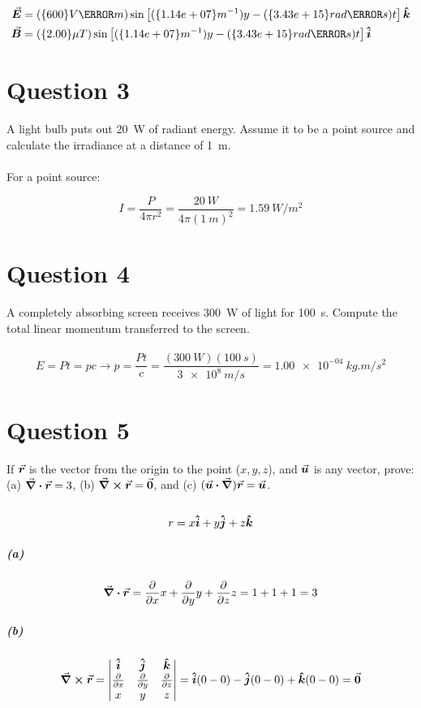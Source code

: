 \documentclass[a4paper]{article}
\begin{document}
\begin{align*}
    \va*{E} &= (\qty{600}{V \per m}) \sin\left[(\qty{1.14e+07}{m^{-1}})y - (\qty{3.43e+15}{rad \per s}) t\right] \vu*{k}  \\
    \va*{B} &= (\qty{2.00}{\mu T}) \sin\left[(\qty{1.14e+07}{m^{-1}})y - (\qty{3.43e+15}{rad \per s}) t\right] \vu*{i}
\end{align*}

\section*{Question 3}
A light bulb puts out \qty{20}{W} of radiant energy. Assume it to be a point source and calculate the
irradiance at a distance of \qty{1}{m}. \\\\

For a point source:

\[
    I = \frac{P}{4 \pi r^2} = \frac{\qty{20}{W}}{4 \pi (\qty{1}{m})^2} = \qty{1.59}{W \per m^2}
\]

\section*{Question 4}
A completely absorbing screen receives \qty{300}{W} of light for \qty{100}{s}. Compute the total linear momentum
transferred to the screen. \\\\

\[
    E = Pt = pc \rightarrow p = \frac{Pt}{c} = \frac{(\qty{300}{W})(\qty{100}{s})}{\qty{3e8}{m \per s}} = \qty{1.00e-04}{kg.m \per s^2}
\]

\section*{Question 5}
If $\va*{r}$ is the vector from the origin to the point ($x, y, z$), and $\va*{u}$ is any vector, prove: (a) $\div{\va*{r}} = 3$, (b) $\curl{\va*{r}} = \va*{0}$, and (c) $(\va*{u} \vdot \grad) \va*{r} = \va*{u}$. \\\\

\[
    r = x\vu*{i} + y\vu*{j} + z\vu*{k}
\]

\subparagraph*{(a)}
\[
    \div{\va*{r}} = \pdv{x} x + \pdv{y} y  + \pdv{z} z = 1 + 1 + 1 = 3
\]

\subparagraph*{(b)}

\[
    \curl{\va*{r}} = 
    \begin{vmatrix}
        \vu*{i} & \vu*{j} & \vu*{k}\\
        \pdv{x} & \pdv{y} & \pdv{z}\\
        x       & y       & z      \\
    \end{vmatrix} = \vu*{i} ( 0 - 0) - \vu*{j}(0 - 0) + \vu*{k}(0 - 0) = \va*{0}
\]
\end{document}
